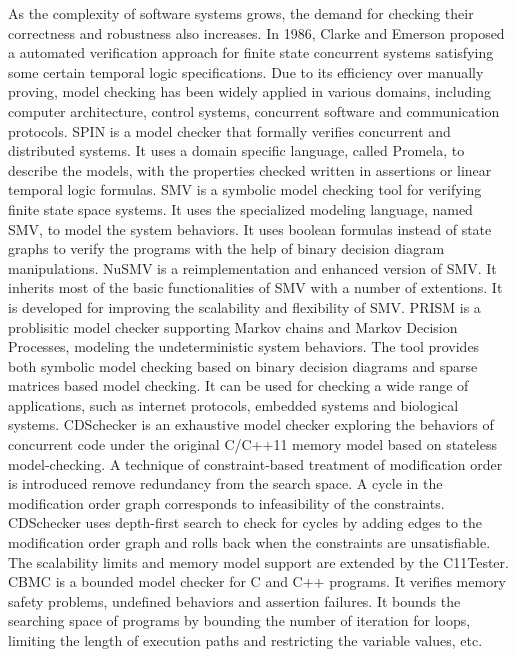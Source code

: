 As the complexity of software systems grows, the demand for checking their correctness and robustness also increases. In 1986, Clarke and Emerson \cite{mc:Clarke} proposed a automated verification approach for finite state concurrent systems satisfying some certain temporal logic specifications. Due to its efficiency over manually proving, model checking has been widely applied in various domains, including computer architecture, control systems, concurrent software and communication protocols.
SPIN\cite{mc:spin} is a model checker that formally verifies concurrent and distributed systems. It uses a domain specific language, called Promela, to describe the models, with the properties checked written in assertions or linear temporal logic formulas.
SMV\cite{mc:smv} is a symbolic model checking tool for verifying finite state space systems. It uses the specialized modeling language, named SMV, to model the system behaviors. It uses boolean formulas instead of state graphs to verify the programs with the help of binary decision diagram manipulations.
NuSMV\cite{mc:NuSMV} is a reimplementation and enhanced version of SMV. It inherits most of the basic functionalities of SMV with a number of extentions. It is developed for improving the scalability and flexibility of SMV.
PRISM\cite{mc:PRISM} is a problisitic model checker supporting Markov chains and Markov Decision Processes, modeling the undeterministic system behaviors. The tool provides both symbolic model checking based on binary decision diagrams and sparse matrices based model checking. It can be used for checking a wide range of applications, such as internet protocols, embedded systems and biological systems.
CDSchecker\cite{cdschecker} is an exhaustive model checker exploring the behaviors of concurrent code under the original C/C++11 memory model based on stateless model-checking. A technique of constraint-based treatment of modification order is introduced remove redundancy from the search space. A cycle in the modification order graph corresponds to infeasibility of the constraints. CDSchecker uses depth-first search to check for cycles by adding edges to the modification order graph and rolls back when the constraints are unsatisfiable. The scalability limits and memory model support are extended by the C11Tester.
CBMC\cite{mc:CBMC} is a bounded model checker for C and C++ programs. It verifies memory safety problems, undefined behaviors and assertion failures. It bounds the searching space of programs by bounding the number of iteration for loops, limiting the length of execution paths and restricting the variable values, etc.
